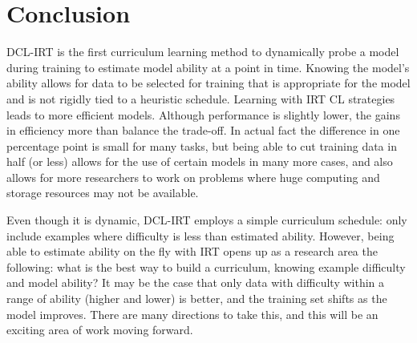 \documentclass[letterpaper]{article} %
\begin{document}
\section{Conclusion} 

DCL-IRT is the first curriculum learning method to dynamically probe a model during training to estimate model ability at a point in time.
Knowing the model's ability allows for data to be selected for training that is appropriate for the model and is not rigidly tied to a heuristic schedule.
Learning with IRT CL strategies leads to more efficient models.
Although performance is slightly lower, the gains in efficiency more than balance the trade-off.
In actual fact the difference in one percentage point is small for many tasks, but being able to cut training data in half (or less) allows for the use of certain models in many more cases, and also allows for more researchers to work on problems where huge computing and storage resources may not be available.

Even though it is dynamic, DCL-IRT employs a simple curriculum schedule: only include examples where difficulty is less than estimated ability.
However, being able to estimate ability on the fly with IRT opens up as a research area the following: what is the best way to build a curriculum, knowing example difficulty and model ability?
It may be the case that only data with difficulty within a range of ability (higher and lower) is better, and the training set shifts as the model improves.
There are many directions to take this, and this will be an exciting area of work moving forward.



\end{document}
